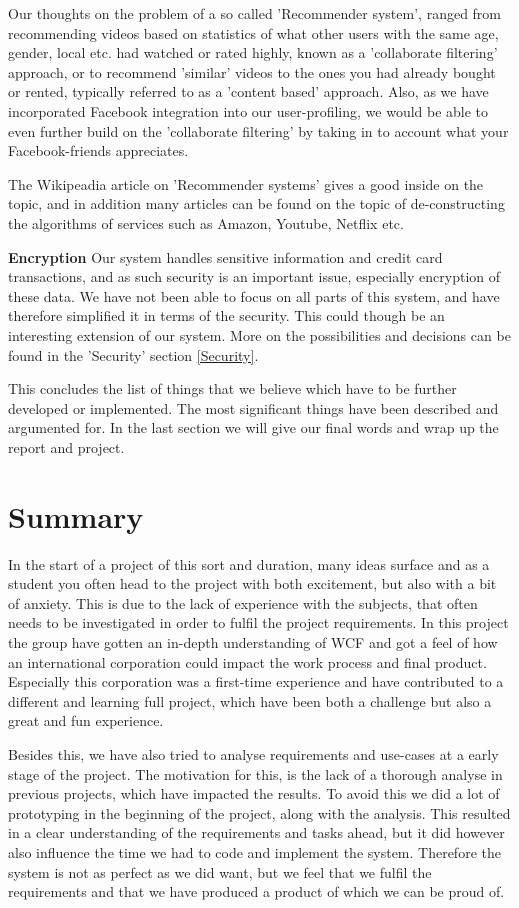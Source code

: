 Our thoughts on the problem of a so called 'Recommender system', ranged from recommending videos based on statistics of what other users with the same age, gender, local etc. had watched or rated highly, known as a 'collaborate filtering' approach, or to recommend 'similar' videos to the ones you had already bought or rented, typically referred to as a 'content based' approach. Also, as we have incorporated Facebook integration into our user-profiling, we would be able to even further build on the 'collaborate filtering' by taking in to account what your Facebook-friends appreciates. \

The Wikipeadia article on 'Recommender systems'\cite{RS} gives a good inside on the topic, and in addition many articles can be found on the topic of de-constructing the algorithms of services such as Amazon, Youtube, Netflix etc. \

\textbf{Encryption}
Our system handles sensitive information and credit card transactions, and as such security is an important issue, especially encryption of these data. We have not been able to focus on all parts of this system, and have therefore simplified it in terms of the security. This could though be an interesting extension of our system. More on the possibilities and decisions can be found in the 'Security' section \ref{Security}. \

This concludes the list of things that we believe which have to be further developed or implemented. The most significant things have been described and argumented for. In the last section we will give our final words and wrap up the report and project.

\newpage
\section{Summary}
In the start of a project of this sort and duration, many ideas surface and as a student you often head to the project with both excitement, but also with a bit of anxiety. This is due to the lack of experience with the subjects, that often needs to be investigated in order to fulfil the project requirements. In this project the group have gotten an in-depth understanding of WCF and got a feel of how an international corporation could impact the work process and final product. Especially this corporation was a first-time experience and have contributed to a different and learning full project, which have been both a challenge but also a great and fun experience. 

Besides this, we have also tried to analyse requirements and use-cases at a early stage of the project. The motivation for this, is the lack of a thorough analyse in previous projects, which have impacted the results. To avoid this we did a lot of prototyping in the beginning of the project, along with the analysis. This resulted in a clear understanding of the requirements and tasks ahead, but it did however also influence the time we had to code and implement the system. Therefore the system is not as perfect as we did want, but we feel that we fulfil the requirements and that we have produced a product of which we can be proud of.






 